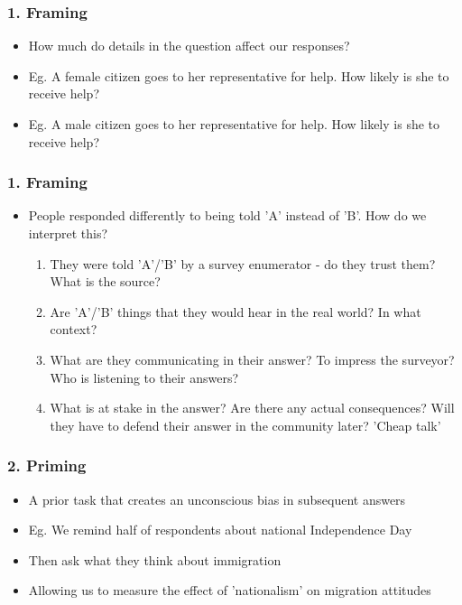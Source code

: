 \documentclass[xcolor=x11names,compress]{beamer}\usepackage[]{graphicx}\usepackage[]{color}
\renewcommand{\(}{\begin{columns}}
\renewcommand{\)}{\end{columns}}
\newcommand{\<}[1]{\begin{column}{#1}}
\renewcommand{\>}{\end{column}}
\begin{document}
\begin{frame}
\frametitle{1. Framing}
\begin{itemize}
\item How much do details in the question affect our responses?
\pause
\item Eg. A female citizen goes to her representative for help. How likely is she to receive help?
\pause
\item Eg. A male citizen goes to her representative for help. How likely is she to receive help?
\end{itemize}
\end{frame}

\begin{frame}
\frametitle{1. Framing}
\begin{itemize}
\item People responded differently to being told 'A' instead of 'B'. How do we interpret this?
\pause
\begin{enumerate}
\item They were told 'A'/'B' by a survey enumerator - do they trust them? What is the source? 
\pause
\item Are 'A'/'B' things that they would hear in the real world? In what context?
\pause
\item What are they communicating in their answer? To impress the surveyor? Who is listening to their answers? 
\pause
\item What is at stake in the answer? Are there any actual consequences? Will they have to defend their answer in the community later? 'Cheap talk'
\end{enumerate}
\end{itemize}
\end{frame}

\begin{frame}
\frametitle{2. Priming}
\begin{itemize}
\item A prior task that creates an unconscious bias in subsequent answers
\pause
\item Eg. We remind half of respondents about national Independence Day
\item Then ask what they think about immigration
\item Allowing us to measure the effect of 'nationalism' on migration attitudes
\end{itemize}
\end{frame}
\end{document}

